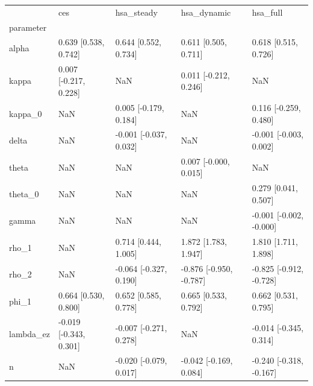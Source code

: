 \begin{tabular}{lllll}
\toprule
 & ces & hsa\_steady & hsa\_dynamic & hsa\_full \\
parameter &  &  &  &  \\
\midrule
alpha & 0.639 [0.538, 0.742] & 0.644 [0.552, 0.734] & 0.611 [0.505, 0.711] & 0.618 [0.515, 0.726] \\
kappa & 0.007 [-0.217, 0.228] & NaN & 0.011 [-0.212, 0.246] & NaN \\
kappa\_0 & NaN & 0.005 [-0.179, 0.184] & NaN & 0.116 [-0.259, 0.480] \\
delta & NaN & -0.001 [-0.037, 0.032] & NaN & -0.001 [-0.003, 0.002] \\
theta & NaN & NaN & 0.007 [-0.000, 0.015] & NaN \\
theta\_0 & NaN & NaN & NaN & 0.279 [0.041, 0.507] \\
gamma & NaN & NaN & NaN & -0.001 [-0.002, -0.000] \\
rho\_1 & NaN & 0.714 [0.444, 1.005] & 1.872 [1.783, 1.947] & 1.810 [1.711, 1.898] \\
rho\_2 & NaN & -0.064 [-0.327, 0.190] & -0.876 [-0.950, -0.787] & -0.825 [-0.912, -0.728] \\
phi\_1 & 0.664 [0.530, 0.800] & 0.652 [0.585, 0.778] & 0.665 [0.533, 0.792] & 0.662 [0.531, 0.795] \\
lambda\_ez & -0.019 [-0.343, 0.301] & -0.007 [-0.271, 0.278] & NaN & -0.014 [-0.345, 0.314] \\
n & NaN & -0.020 [-0.079, 0.017] & -0.042 [-0.169, 0.084] & -0.240 [-0.318, -0.167] \\
\bottomrule
\end{tabular}
